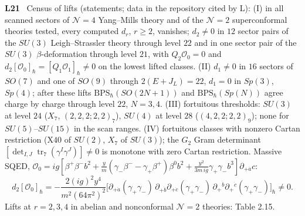 \documentclass[10pt,a4paper]{article}
\numberwithin{equation}{section}
\newcommand{\cO}{\mathcal O}
\newcommand{\LL}[2]{\textsf{L}(#1){\scriptsize\,\texttt{#2}}}
\newcommand{\rid}[1]{\par\medskip\noindent\textbf{#1}\ }
\newcommand{\ptr}[2]{\par\nopagebreak{\footnotesize\raggedleft[\,#1\ $\mid$\ #2\,]\par}}
\newcommand{\st}[1]{\textsf{#1}}
\begin{document}
\rid{L21} Census of lifts (statements; data in the repository cited by \textsf{L}):
(I) in all scanned sectors of $\mathcal N=4$ Yang--Mills theory and of the $\mathcal N=2$ superconformal theories tested, every computed $d_r$, $r\ge2$, vanishes; $d_2\ne0$ in $12$ sector pairs of the $SU(3)$ Leigh--Strassler theory through level $22$ and in one sector pair of the $SU(3)$ $\beta$-deformation through level $21$, with $Q_2\cO_0=0$ and $d_2[\cO_0]_\hbar=[Q_1\cO_1]_\hbar\ne0$ on the lowest lifted classes.
(II) $d_1\ne0$ in $16$ sectors of $SO(7)$ and one of $SO(9)$ through $2(E+J_L)=22$, $d_1=0$ in $Sp(3)$, $Sp(4)$; after these lifts $\mathrm{BPS}_\hbar(SO(2N+1))$ and $\mathrm{BPS}_\hbar(Sp(N))$ agree charge by charge through level $22$, $N=3,4$.
(III) fortuitous thresholds: $SU(3)$ at level $24$ ($X_7$, $(2,2,2;2,2)_7$), $SU(4)$ at level $28$ ($(4,2,2;2,2)_9$); none for $SU(5)$--$SU(15)$ in the scan ranges.
(IV) fortuitous classes with nonzero Cartan restriction ($\mathrm{X40}$ of $SU(2)$, $X_7$ of $SU(3)$); the $G_2$ Gram determinant $[\det_{I,J}\operatorname{tr}_7(\gamma^I\gamma^J)]\ne0$ is monotone with zero Cartan restriction.
Massive SQED, $\cO_0=ig[\beta^+\beta^-b^2+\tfrac ym(\gamma_-\beta^--\gamma_+\beta^+)\beta^0b^2+\tfrac{y^2}{3m\,ig}\gamma_+\gamma_-b^3]\partial_{+\dot a}c$:
\begin{equation*}
d_2[\cO_0]_\hbar=-\frac{2(ig)^2y^4}{m^2(64\pi^2)^2}\Big[\partial_{+\dot a}(\gamma_+\gamma_-)\,\partial_{+\dot b}\partial_{+\dot c}(\gamma_+\gamma_-)\,\partial_+{}^{\dot b}\partial_+{}^{\dot c}(\gamma_+\gamma_-)\Big]_\hbar\ne0 .
\end{equation*}
Lifts at $r=2,3,4$ in abelian and nonconformal $\mathcal N=2$ theories: Table 2.15.
\ptr{\textsf{L}~\S2.3: Tables 2.1--2.15; \LL{2.24}{local-ch9-g2-gram-class}, \LL{2.26}{local-ch9-ls-first-pages}, \LL{2.28}{local-ch9-beta-first-lift}, \LL{2.35}{local-ch9-sqed-source}, \LL{2.37}{local-ch9-sqed-lift}}{\st{C} in \textsf{L}: ranks over $\mathbb Q$, modulo $p=2^{31}-1$, or two primes, as tagged in the tables of \textsf{L}; not re-run here}
\end{document}
